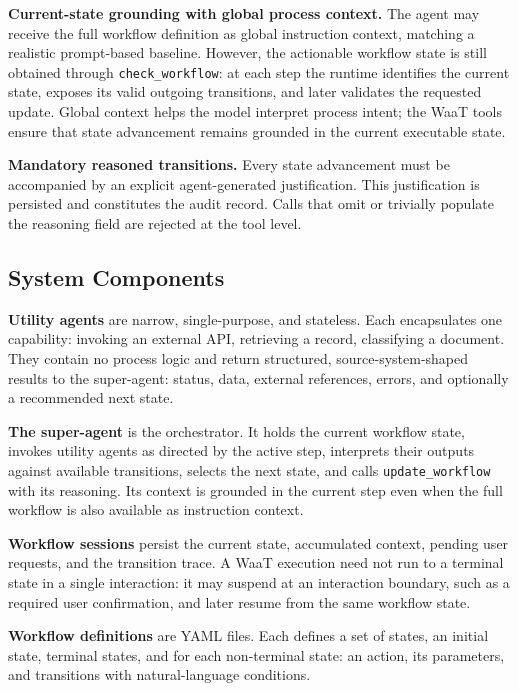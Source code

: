 \documentclass[10pt,conference]{IEEEtran}
\begin{document}
\textbf{Current-state grounding with global process context.}
The agent may receive the full workflow definition as global
instruction context, matching a realistic prompt-based baseline.
However, the actionable workflow state is still obtained through
\texttt{check\_workflow}: at each step the runtime identifies the
current state, exposes its valid outgoing transitions, and later
validates the requested update.  Global context helps the model
interpret process intent; the WaaT tools ensure that state
advancement remains grounded in the current executable state.

\textbf{Mandatory reasoned transitions.}
Every state advancement must be accompanied by an explicit
agent-generated justification.  This justification is persisted
and constitutes the audit record.  Calls that omit or trivially
populate the reasoning field are rejected at the tool level.

\subsection{System Components}

\textbf{Utility agents} are narrow, single-purpose, and stateless.
Each encapsulates one capability: invoking an external API,
retrieving a record, classifying a document.  They contain no
process logic and return structured, source-system-shaped results
to the super-agent: status, data, external references, errors, and
optionally a recommended next state.

\textbf{The super-agent} is the orchestrator.  It holds the
current workflow state, invokes utility agents as directed by the
active step, interprets their outputs against available
transitions, selects the next state, and calls
\texttt{update\_workflow} with its reasoning.  Its context is
grounded in the current step even when the full workflow is also
available as instruction context.

\textbf{Workflow sessions} persist the current state, accumulated
context, pending user requests, and the transition trace.  A WaaT
execution need not run to a terminal state in a single interaction:
it may suspend at an interaction boundary, such as a required user
confirmation, and later resume from the same workflow state.

\textbf{Workflow definitions} are YAML files.  Each defines a set
of states, an initial state, terminal states, and for each
non-terminal state: an action, its parameters, and transitions
with natural-language conditions.
\end{document}
